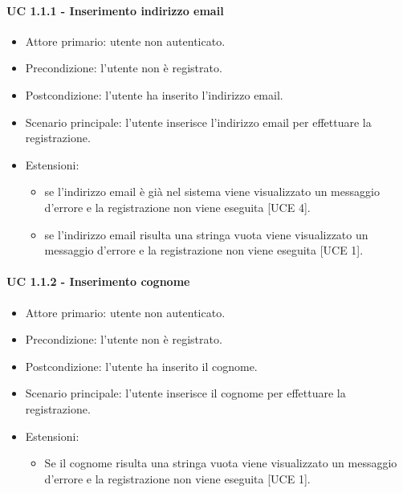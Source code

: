         \paragraph{UC 1.1.1 - Inserimento indirizzo email}
            \begin{itemize}
                \item Attore primario: utente non autenticato.
                \item Precondizione: l'utente non è registrato.
                \item Postcondizione: l'utente ha inserito l'indirizzo email.
                \item Scenario principale: l'utente inserisce l'indirizzo email per effettuare la registrazione.
                \item Estensioni:
                    \begin{itemize}
                        \item se l'indirizzo email è già nel sistema viene visualizzato un messaggio d'errore e la registrazione non viene eseguita [UCE 4].
                        \item se l'indirizzo email risulta una stringa vuota viene visualizzato un messaggio d'errore e la registrazione non viene eseguita [UCE 1].
                    \end{itemize}
            \end{itemize}
        \paragraph{UC 1.1.2 - Inserimento cognome}
            \begin{itemize}
                \item Attore primario: utente non autenticato.
                \item Precondizione: l'utente non è registrato.
                \item Postcondizione: l'utente ha inserito il cognome.
                \item Scenario principale: l'utente inserisce il cognome per effettuare la registrazione.
                \item Estensioni:
                    \begin{itemize}
                        \item Se il cognome risulta una stringa vuota viene visualizzato un messaggio d'errore e la registrazione non viene eseguita [UCE 1].
                    \end{itemize}
            \end{itemize}
